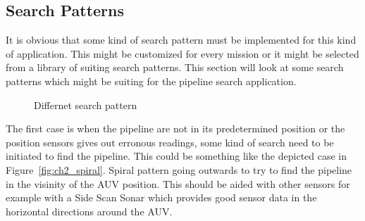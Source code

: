 	
	\subsection{Search Patterns}
		\label{subsec:ch2_searchpattern}
		It is obvious that some kind of search pattern must be implemented for this kind of
		application. This might be customized for every mission or it might be selected from a library
		of suiting search patterns. 
		This section will look at some search patterns which might be suiting for the pipeline search
		application.

		\begin{figure}[htbp]
			\centering
			 \quad
			\caption{Differnet search pattern}
			\label{fig:ch2_searchpattern}
		\end{figure}
		The first case is when the pipeline are not in its predetermined position or the position
		sensors gives out erronous readings, some kind of search need to be initiated to find the
		pipeline. This could be something like the depicted case in Figure~\ref{fig:ch2_spiral}.
		Spiral pattern going outwards to try to find the pipeline in the visinity of the AUV position.
		This should be aided with other sensors for example with a Side Scan Sonar which provides good
		sensor data in the horizontal directions around the AUV. 

